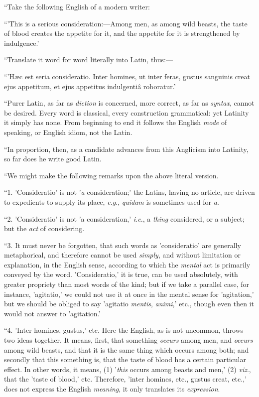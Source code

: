``Take the following English of a modern writer:

``'This is a serious consideration:—Among men, as among wild
beasts, the taste of blood creates the appetite for it, and the
appetite for it is strengthened by indulgence.'

``Translate it word for word literally into Latin, thus:—

``'Hæc est seria consideratio. Inter homines, ut inter feras,
gustus sanguinis creat ejus appetitum, et ejus appetitus indulgentiâ
roboratur.'

``Purer Latin, as far as \emph{diction} is concerned, more
correct, as far as \emph{syntax}, cannot be desired. Every word is
classical, every construction grammatical: yet Latinity it simply has
none. From beginning to end it follows the English \emph{mode} of
speaking, or English idiom, not the Latin.

``In proportion, then, as a candidate advances from this
Anglicism into Latinity, so far does he write good Latin.

``We might make the following remarks upon the above literal
version.

``1. 'Consideratio' is not '\emph{a} consideration;' the Latins,
having no article, are driven to expedients to supply its place, \emph{e.g}.,
\emph{quidam} is sometimes used for \emph{a}.

``2. 'Consideratio' is not 'a consideration,' \emph{i.e}., a \emph{thing}
considered, or a subject; but the \emph{act} of considering.

``3. It must never be forgotten, that such words as 'consideratio'
are generally metaphorical, and therefore cannot be used \emph{simply},
and without limitation or explanation, in the English sense,
according to which the \emph{mental} act is primarily conveyed by the
word. 'Consideratio,' it is true, can be used absolutely, with greater
propriety than most words of the kind; but if we take a parallel case,
for instance, 'agitatio,' we could not use it at once in the mental
sense for 'agitation,' but we should be obliged to say 'agitatio \emph{mentis},
\emph{animi},' etc., though even then it would not answer to
'agitation.'

``4. 'Inter homines, gustus,' etc. Here the English, as is not
uncommon, throws two ideas together. It means, first, that something \emph{occurs}
among men, and \emph{occurs} among wild beasts, and that it is the
same thing which occurs among both; and secondly that this something
is, that the taste of blood has a certain particular effect. In other
words, it means, (1) '\emph{this} occurs among beasts and men,' (2) \emph{viz}.,
that the 'taste of blood,' etc. Therefore, 'inter homines, etc.,
gustus creat, etc.,' does not express the English \emph{meaning}, it
only translates its \emph{expression}.

